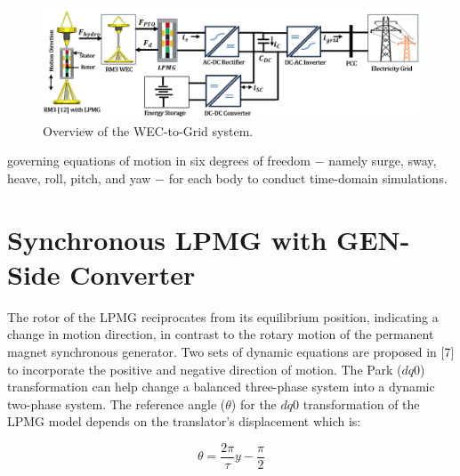 \documentclass[conference]{IEEEtran}
\begin{document}
\begin{figure}[ht]
    \centering
    \includegraphics[width=\textwidth]{Figs/5_3_1/block dia2.png}
    \vspace{-2em}
    \caption{Overview of the WEC-to-Grid system.}
    \label{fig:your-label}
\end{figure}




governing equations of motion in six degrees of freedom $-$ namely
surge, sway, heave, roll, pitch, and yaw $-$ for each body to conduct time-domain simulations.

\section{Synchronous LPMG with GEN- Side Converter}
The rotor of the LPMG reciprocates from its equilibrium position, indicating a change in motion direction, in contrast to the rotary motion of the permanent magnet synchronous generator. Two sets of dynamic equations are proposed in [7] to incorporate the positive and negative direction of motion.
The Park ($dq0$) transformation can help change a balanced three-phase system into a dynamic two-phase system. The reference angle ($\theta$) for the $dq0$ transformation of the LPMG model depends on the translator's displacement which is:

\begin{equation}
\theta = \frac{2\pi}{\tau}y - \frac{\pi}{2}
\end{equation}
\end{document}
